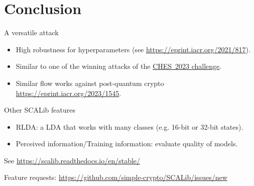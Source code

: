 \documentclass[aspectratio=169]{beamer}
\begin{document}
\section{Conclusion}
\begin{frame}{A versatile attack}
    \begin{itemize}
        \item High robustness for hyperparameters (see \url{https://eprint.iacr.org/2021/817}).
        \item Similar to one of the winning attacks of the \href{https://ches.iacr.org/2023/challenge.php}{CHES~2023 challenge}.
        \item Similar flow works against post-quantum crypto \url{https://eprint.iacr.org/2023/1545}.
    \end{itemize}
\end{frame}

\begin{frame}{Other SCALib features}
    \begin{itemize}
        \item RLDA: a LDA that works with many classes (e.g. 16-bit or 32-bit states).
        \item Perceived information/Training information: evaluate quality of models.
    \end{itemize}

    See \url{https://scalib.readthedocs.io/en/stable/}

    Feature requests: \url{https://github.com/simple-crypto/SCALib/issues/new}
\end{frame}
\end{document}

